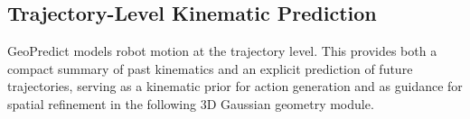 

\subsection{Trajectory-Level Kinematic Prediction} \label{sec:track_query}



GeoPredict models robot motion at the trajectory level. This provides both a compact summary of past kinematics and an explicit prediction of future trajectories, serving as a kinematic prior for action generation and as guidance for spatial refinement in the following 3D Gaussian geometry module.



